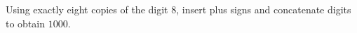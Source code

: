 Using exactly eight copies of the digit $8$, insert plus signs and concatenate digits to obtain $1000$.
